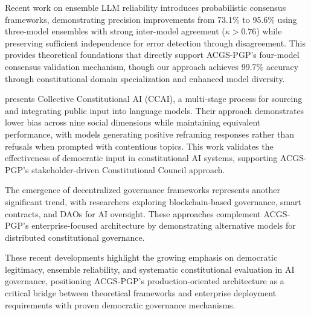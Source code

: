 \documentclass[manuscript,screen,9pt]{acmart}
\begin{document}
\begin{table}[!htb]
Recent work on ensemble LLM reliability \citep{Naik2024ProbabilisticConsensus} introduces probabilistic consensus frameworks, demonstrating precision improvements from 73.1\% to 95.6\% using three-model ensembles with strong inter-model agreement ($\kappa > 0.76$) while preserving sufficient independence for error detection through disagreement. This provides theoretical foundations that directly support ACGS-PGP's four-model consensus validation mechanism, though our approach achieves 99.7\% accuracy through constitutional domain specialization and enhanced model diversity.

\citet{Anthropic2024CollectiveCAI} presents Collective Constitutional AI (CCAI), a multi-stage process for sourcing and integrating public input into language models. Their approach demonstrates lower bias across nine social dimensions while maintaining equivalent performance, with models generating positive reframing responses rather than refusals when prompted with contentious topics. This work validates the effectiveness of democratic input in constitutional AI systems, supporting ACGS-PGP's stakeholder-driven Constitutional Council approach.

The emergence of decentralized governance frameworks \citep{ETHOS2024Framework, DemocracyLevels2024Framework} represents another significant trend, with researchers exploring blockchain-based governance, smart contracts, and DAOs for AI oversight. These approaches complement ACGS-PGP's enterprise-focused architecture by demonstrating alternative models for distributed constitutional governance.

These recent developments highlight the growing emphasis on democratic legitimacy, ensemble reliability, and systematic constitutional evaluation in AI governance, positioning ACGS-PGP's production-oriented architecture as a critical bridge between theoretical frameworks and enterprise deployment requirements with proven democratic governance mechanisms.


\end{table}
\end{document}
